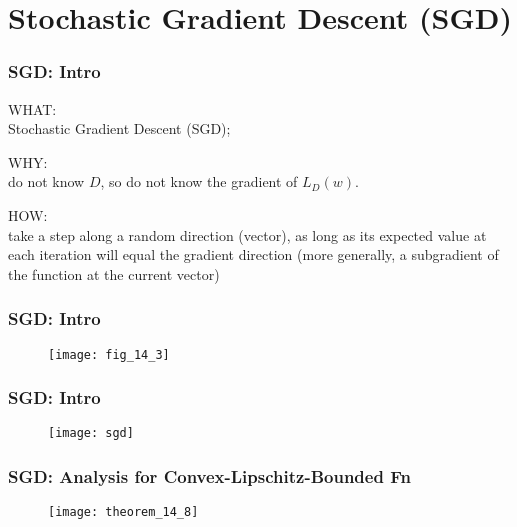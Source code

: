 \section{Stochastic Gradient Descent (SGD)}

\begin{frame}
\frametitle{SGD: Intro}

WHAT:\\
Stochastic Gradient Descent (SGD);
\vspace{5mm}

WHY:\\
do not know $D$, so do not know the gradient of $L_D(w)$.
\vspace{5mm}

HOW:\\
take a step along a random direction (vector), as long as
its expected value at each iteration will equal the gradient direction
(more generally, a subgradient of the function at the current vector)
\end{frame}

\begin{frame}
\frametitle{SGD: Intro}

\begin{figure}
    \centering
    \texttt{[image: fig\_14\_3]}
\end{figure}

\end{frame}

\begin{frame}
\frametitle{SGD: Intro}

\begin{figure}
    \centering
    \texttt{[image: sgd]}
\end{figure}

\end{frame}



\begin{frame}
\frametitle{SGD: Analysis for Convex-Lipschitz-Bounded Fn}

\begin{figure}
    \centering
    \texttt{[image: theorem\_14\_8]}
\end{figure}

\end{frame}
